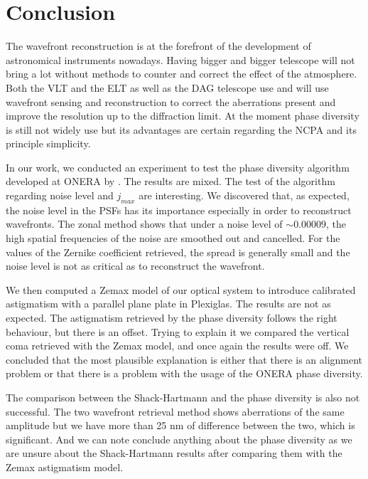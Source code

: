 
\chapter*{Conclusion}
\label{Conclusion}

The wavefront reconstruction is at the forefront of the development of astronomical instruments nowadays. Having bigger and bigger telescope will not bring a lot without methods to counter and correct the effect of the atmosphere. Both the VLT and the ELT as well as the DAG telescope use and will use wavefront sensing and reconstruction to correct the aberrations present and improve the resolution up to the diffraction limit. At the moment phase diversity is still not widely use but its advantages are certain regarding the NCPA and its principle simplicity.

\vspace{1cm}

In our work, we conducted an experiment to test the phase diversity algorithm developed at ONERA by \citet{mugnier_2006}. The results are mixed. The test of the algorithm regarding noise level and $j_{max}$ are interesting. We discovered that, as expected, the noise level in the PSFs has its importance especially in order to reconstruct wavefronts. The zonal method shows that under a noise level of $\sim0.00009$, the high spatial frequencies of the noise are smoothed out and cancelled. For the values of the Zernike coefficient retrieved, the spread is generally small and the noise level is not as critical as to reconstruct the wavefront.

We then computed a Zemax model of our optical system to introduce calibrated astigmatism with a parallel plane plate in Plexiglas. The results are not as expected. The astigmatism retrieved by the phase diversity follows the right behaviour, but there is an offset. Trying to explain it we compared the vertical coma retrieved with the Zemax model, and once again the results were off. We concluded that the most plausible explanation is either that there is an alignment problem or that there is a problem with the usage of the ONERA phase diversity.

The comparison between the Shack-Hartmann and the phase diversity is also not successful. The two wavefront retrieval method shows aberrations of the same amplitude but we have more than 25 nm of difference between the two, which is significant. And we can note conclude anything about the phase diversity as we are unsure about the Shack-Hartmann results after comparing them with the Zemax astigmatism model.

